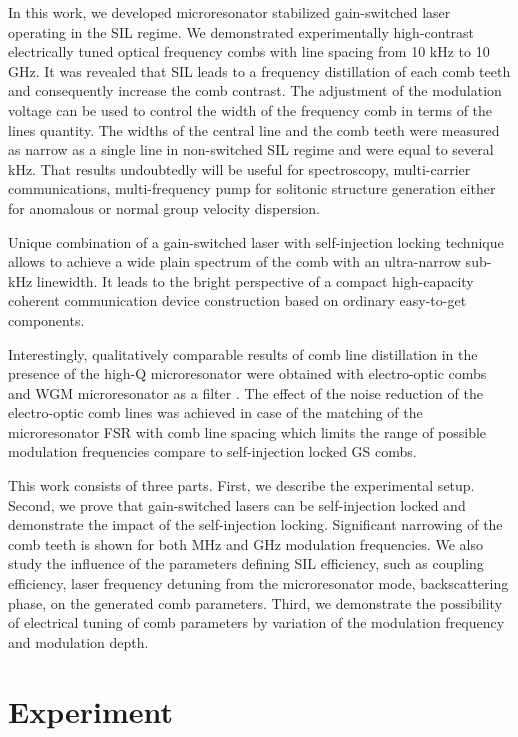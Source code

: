 \documentclass[a4paper, amsfonts, amssymb, amsmath, reprint, showkeys, nofootinbib, twoside,longbibliography, aps]{revtex4-1}
\begin{document}
In this work, we developed microresonator stabilized gain-switched laser operating in the SIL regime. We demonstrated experimentally high-contrast electrically tuned optical frequency combs with line spacing from 10 kHz to 10 GHz. It was revealed that SIL leads to a frequency distillation of each comb teeth and consequently increase the comb contrast. 
The adjustment of the modulation voltage can be used to control the width of the frequency comb in terms of the lines quantity. The widths of the central line and the comb teeth were measured as narrow as a single line in non-switched SIL regime and were equal to several kHz. That results undoubtedly will be useful for spectroscopy, multi-carrier communications, multi-frequency pump for solitonic structure generation either for anomalous or normal group velocity dispersion.





Unique combination of a gain-switched laser with self-injection locking technique allows to achieve a wide plain spectrum of the comb with an ultra-narrow sub-kHz linewidth. It leads to the bright perspective of a compact high-capacity coherent communication device construction based on ordinary easy-to-get components.   


Interestingly, qualitatively comparable results of comb line distillation in the presence of the high-Q microresonator were obtained with electro-optic combs and WGM microresonator as a filter \cite{prayoonyong2021optical}. The effect of the noise reduction of the electro-optic comb lines was achieved in case of the matching of the microresonator FSR with comb line spacing which limits the range of possible modulation frequencies compare to self-injection locked GS combs. 




This work consists of three parts. First, we describe the experimental setup. Second, we prove that gain-switched lasers can be self-injection locked and demonstrate the impact of the self-injection locking. Significant narrowing of the comb teeth is shown for both MHz and GHz modulation frequencies. We also study the influence of the parameters defining SIL efficiency, such as coupling efficiency, laser frequency detuning from the microresonator mode, backscattering phase, on the generated comb parameters. Third, we demonstrate the possibility of electrical tuning of comb parameters by variation of the modulation frequency and modulation depth.


\section{Experiment}
\end{document}

